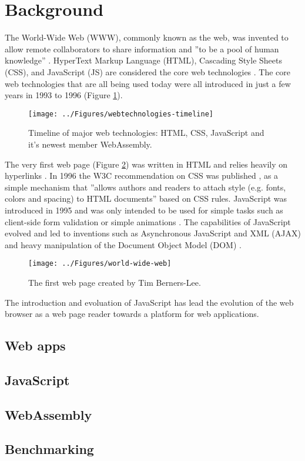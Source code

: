 \section{Background}
\label{background}

The World-Wide Web (WWW), commonly known as the web, was invented to allow remote collaborators to share information and ''to be a pool of human knowledge'' \parencite[76]{BernersLeeCailliauLuotonenNielsenSecret1994}. HyperText Markup Language (HTML), Cascading Style Sheets (CSS), and JavaScript (JS) are considered the core web technologies \parencite{MajchrzakBiornHansenGronli2018}. The core web technologies that are all being used today were all introduced in just a few years in 1993 to 1996 (Figure \ref{webtechnologies-timeline}).

\begin{figure}[!h]
\centering
\texttt{[image: ../Figures/webtechnologies-timeline]}
\caption{Timeline of major web technologies: HTML, CSS, JavaScript and it's newest member WebAssembly.}
\label{webtechnologies-timeline}
\end{figure}

The very first web page (Figure \ref{world-wide-web}) was written in HTML and relies heavily on hyperlinks \parencite{BernersLeeCailliauGroffPollermann1992}. In 1996 the W3C recommendation on CSS was published \parencite{LieBos1996}, as a simple mechanism that ''allows authors and readers to attach style (e.g. fonts, colors and spacing) to HTML documents'' \parencite*[1]{LieBos1996} based on CSS rules. JavaScript was introduced in 1995 and was only intended to be used for simple tasks such as client-side form validation or simple animations \parencite{Moller2018}. The capabilities of JavaScript evolved and led to inventions such as Asynchronous JavaScript and XML (AJAX) \parencite{NielsonWilliamsonArlitt2008} and heavy manipulation of the Document Object Model (DOM) \parencite{WoodLeHorsApparaoByrneChampionIsaacsJacobsNicolRobieSutor1998}.

\begin{figure}[!h]
\centering
\texttt{[image: ../Figures/world-wide-web]}
\caption{The first web page created by Tim Berners-Lee.}
\label{world-wide-web}
\end{figure}

The introduction and evoluation of JavaScript has lead the evolution of the web browser as a web page reader towards a platform for web applications.

\subsection{Web apps}


\subsection{JavaScript}


\subsection{WebAssembly}


\subsection{Benchmarking}

